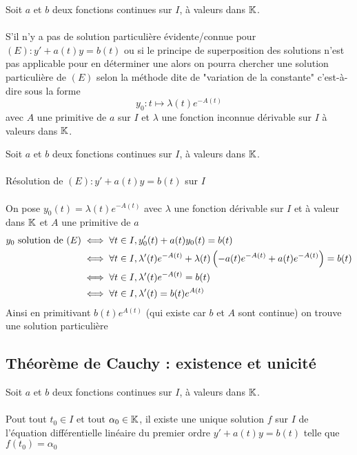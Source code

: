 \begin{defprop}

    Soit \(a\) et \(b\) deux fonctions continues sur \(I\), à valeurs dans \(\mathbb{K}\).\\~\\
    S’il n’y a pas de solution particulière évidente/connue pour \((E) : y' + a(t)y = b(t)\) ou si le principe de superposition des solutions n’est pas applicable pour en déterminer une alors on pourra chercher une solution particulière de \((E)\) selon la méthode dite de "variation de la constante" c’est-à-dire sous la forme
    \[y_0 : t \mapsto \lambda(t)e^{-A(t)}\]
    avec \(A\) une primitive de \(a\) sur \(I\) et \(\lambda\) une fonction inconnue dérivable sur \(I\) à valeurs dans \(\mathbb{K}\).
\end{defprop}

\begin{dem}
    Soit \(a\) et \(b\) deux fonctions continues sur \(I\), à valeurs dans \(\mathbb{K}\).\\~\\
    Résolution de \((E) : y' + a(t)y = b(t)\) sur \(I\)\\~\\
    On pose \(y_0(t) = \lambda(t)e^{-A(t)}\) avec \(\lambda\) une fonction dérivable sur \(I\) et à valeur dans \(\mathbb{K}\) et \(A\) une primitive de \(a\)
    \begin{align*}
        y_0 \text{ solution de } (E) &\iff \forall t \in I,y_0'(t) + a(t)y_0(t) = b(t) \\
        &\iff \forall t \in I,\lambda'(t)e^{-A(t)} + \lambda(t)\left(-a(t)e^{-A(t)} + a(t)e^{-A(t)}\right) = b(t) \\
        &\iff \forall t \in I,\lambda'(t)e^{-A(t)} = b(t) \\
        &\iff \forall t \in I, \lambda'(t) = b(t)e^{A(t)}
    \end{align*}
    Ainsi en primitivant \(b(t)e^{A(t)}\) (qui existe car \(b\) et \(A\) sont continue) on trouve une solution particulière
\end{dem}

\subsection{Théorème de Cauchy : existence et unicité}
\begin{theo}
    Soit \(a\) et \(b\) deux fonctions continues sur \(I\), à valeurs dans \(\mathbb{K}\).\\~\\
    Pout tout \(t_0 \in I\) et tout \(\alpha_0 \in \mathbb{K} \), il existe une unique solution \(f\) sur \(I\) de l’équation différentielle linéaire du premier ordre \(y' + a(t)y = b(t)\) telle que \(f(t_0) = \alpha_0\)
\end{theo}

